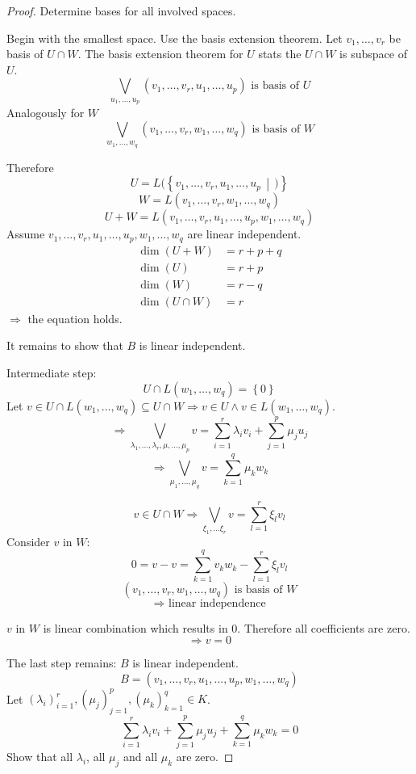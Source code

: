 \documentclass[a4paper,landscape,twocolumn]{article}
\newcommand\set[1]{\left\{#1\right\}}
\newcommand\setdef[2]{\left\{#1\,\middle|\,#2\right\}}
\begin{document}
\begin{proof}
  Determine bases for all involved spaces.

  Begin with the smallest space. Use the basis extension theorem.
  Let $v_1, \dots, v_r$ be basis of $U \cap W$.
  The basis extension theorem for $U$ stats the $U \cap W$ is subspace of $U$.
  \[ \bigvee_{u_1, \dots, u_p} (v_1, \dots, v_r, u_1, \dots, u_p) \text{ is basis of } U \]
  Analogously for $W$
  \[ \bigvee_{w_1, \dots, w_q} (v_1, \dots, v_r, w_1, \dots, w_q) \text{ is basis of } W \]

  Therefore
  \[ U = L(\setdef{v_1, \dots, v_r, u_1, \dots, u_p}) \]
  \[ W = L(v_1, \dots, v_r, w_1, \dots, w_q) \]
  \[ U + W = L(v_1, \dots, v_r, u_1, \dots, u_p, w_1, \dots, w_q) \]
  Assume $v_1, \dots, v_r, u_1, \dots, u_p, w_1, \dots, w_q$ are linear independent.
  \begin{align*}
        \dim(U+W) &= r + p + q \\
          \dim(U) &= r+p \\
          \dim(W) &= r-q \\
    \dim(U\cap W) &= r
  \end{align*}
  $\Rightarrow$ the equation holds.

  It remains to show that $B$ is linear independent.

  Intermediate step:
  \[ U \cap L(w_1, \dots, w_q) = \set{0} \]
  Let $v \in U \cap L(w_1, \dots, w_q) \subseteq U \cap W \Rightarrow v \in U \land v \in L(w_1, \dots, w_q)$.
  \[ \Rightarrow \bigvee_{\lambda_1, \dots, \lambda_r, \mu, \dots, \mu_p} v = \sum_{i=1}^r \lambda_i v_i + \sum_{j=1}^p \mu_j u_j \]
  \[ \Rightarrow \bigvee_{\mu_1, \dots, \mu_q} v = \sum_{k=1}^q \mu_k w_k \]

  \[ v \in U \cap W \Rightarrow \bigvee_{\xi_1, \dots \xi_r} v = \sum_{l=1}^r \xi_l v_l \]
  Consider $v$ in $W$:
  \[ 0 = v - v = \sum_{k=1}^q v_k w_k - \sum_{l=1}^r \xi_l v_l \]
  \[ (v_1, \dots, v_r, w_1, \dots, w_q) \text{ is basis of } W \]
  \[ \Rightarrow \text{ linear independence} \]

  $v$ in $W$ is linear combination which results in $0$. Therefore all coefficients are zero.
  \[ \Rightarrow v = 0 \]

  The last step remains: $B$ is linear independent.
  \[ B = (v_1, \dots, v_r, u_1, \dots, u_p, w_1, \dots, w_q) \]
  Let $(\lambda_i)^r_{i=1}, (\mu_j)^p_{j=1}, (\mu_k)_{k=1}^q \in K$.
  \[ \sum_{i=1}^r \lambda_i v_i + \sum_{j=1}^p \mu_j u_j + \sum_{k=1}^q \mu_k w_k = 0 \]
  Show that all $\lambda_i$, all $\mu_j$ and all $\mu_k$ are zero.


\end{proof}
\end{document}
